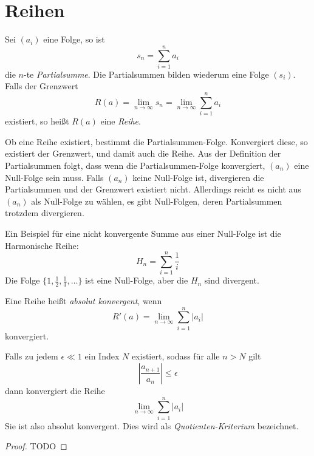 \section{Reihen}

\begin{definition}
Sei $(a_i)$ eine Folge, so ist 
\[
s_n = \sum_{i=1}^{n} a_i
\]
die $n$-te \textsl{Partialsumme}. Die Partialsummen bilden wiederum eine Folge $(s_i)$. Falls der Grenzwert 
\[
R(a) = \lim_{n\rightarrow \infty} s_n = \lim_{n\rightarrow \infty} \sum_{i=1}^{n} a_i
\]
existiert, so heißt $R(a)$ eine \textsl{Reihe}.
\end{definition}

Ob eine Reihe existiert, bestimmt die Partialsummen-Folge. Konvergiert diese, so existiert der Grenzwert, und damit auch die Reihe. Aus der Definition der Partialsummen folgt, dass wenn die Partialsummen-Folge konvergiert, $(a_n)$ eine Null-Folge sein muss. Falls $(a_n)$ keine Null-Folge ist, divergieren die Partialsummen und der Grenzwert  existiert nicht. Allerdings reicht es nicht aus $(a_n)$ als Null-Folge zu wählen, es gibt Null-Folgen, deren Partialsummen trotzdem divergieren. 

Ein Beispiel für eine nicht konvergente Summe aus einer Null-Folge ist die Harmonische Reihe:
\[
H_n = \sum_{i=1}^{n} \frac{1}{i}
\]
Die Folge $\lbrace 1, \frac{1}{2}, \frac{1}{3}, \dots \rbrace$ ist eine Null-Folge, aber die $H_n$ sind divergent.

\begin{definition}
Eine Reihe heißt \textsl{absolut konvergent}, wenn 
\[
R'(a) = \lim_{n\rightarrow \infty} \sum_{i=1}^{n} \vert a_i \vert
\]
konvergiert.
\end{definition}

\begin{lemma}
Falls zu jedem $\epsilon \ll 1$ ein Index $N$ existiert, sodass für alle $n>N$ gilt
\[
\left\vert \frac{a_{n+1}}{a_n} \right\vert \le \epsilon
\]
dann konvergiert die Reihe 
\[
\lim\limits_{n\rightarrow \infty} \sum_{i=1}^{n} \vert a_i \vert
\]
Sie ist also absolut konvergent. Dies wird als \textsl{Quotienten-Kriterium} bezeichnet.
\end{lemma}
\begin{proof}
TODO
\end{proof}

